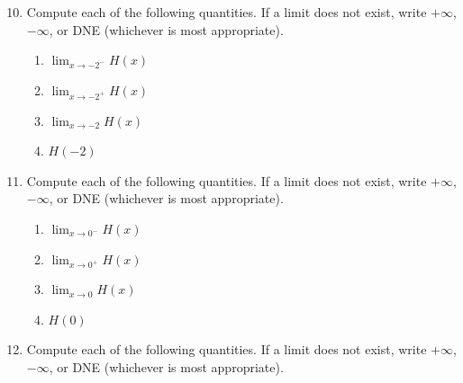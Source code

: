 \documentclass[12pt]{article}
\newif\ifans
\begin{document}
\begin{enumerate}
\setcounter{enumi}{9}

\item Compute each of the following quantities.  If a limit does not exist, write $+\infty$, $-\infty$, or DNE (whichever is most appropriate). 

\begin{enumerate}

\item $\displaystyle \lim_{x \rightarrow -2^{-}}{H(x)}$

\ifans{\fbox{$1$}} \fi

\item $\displaystyle \lim_{x \rightarrow -2^{+}}{H(x)}$

\ifans{\fbox{$+\infty$}} \fi

\item $\displaystyle \lim_{x \rightarrow -2}{H(x)}$

\ifans{\fbox{DNE}} \fi

\item $H(-2)$

\ifans{\fbox{Undefined}} \fi

\end{enumerate}

\item Compute each of the following quantities.  If a limit does not exist, write $+\infty$, $-\infty$, or DNE (whichever is most appropriate). 

\begin{enumerate}

\item $\displaystyle \lim_{x \rightarrow 0^{-}}{H(x)}$

\ifans{\fbox{$-\infty$}} \fi

\item $\displaystyle \lim_{x \rightarrow 0^{+}}{H(x)}$

\ifans{\fbox{$-1$}} \fi

\item $\displaystyle \lim_{x \rightarrow 0}{H(x)}$

\ifans{\fbox{DNE}} \fi

\item $H(0)$

\ifans{\fbox{$1$}} \fi

\end{enumerate}

\item Compute each of the following quantities.  If a limit does not exist, write $+\infty$, $-\infty$, or DNE (whichever is most appropriate). 


\end{enumerate}
\end{document}
